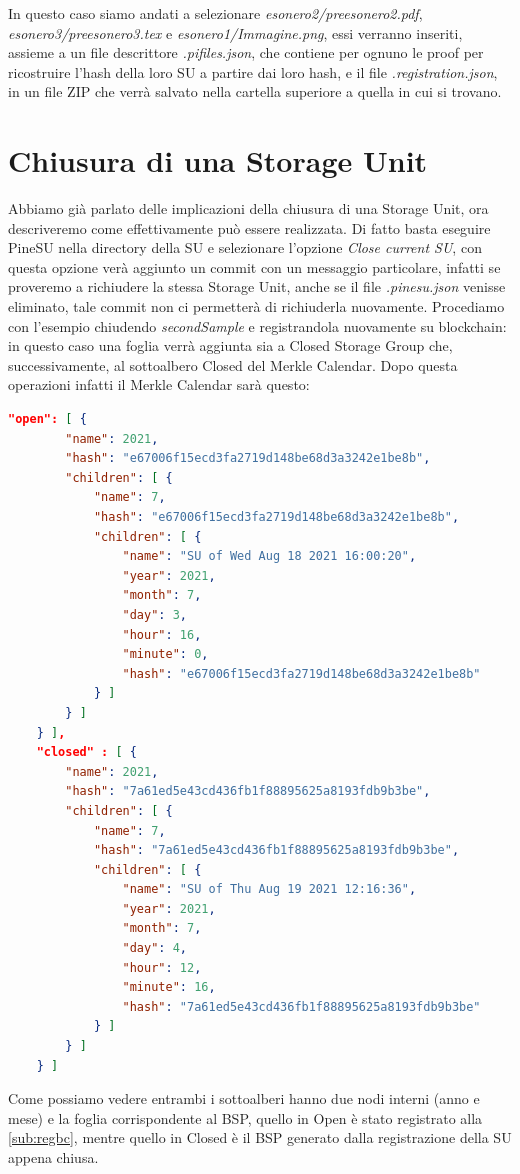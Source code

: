 In questo caso siamo andati a selezionare \emph{esonero2/preesonero2.pdf},
\emph{esonero3/preesonero3.tex} e \emph{esonero1/Immagine.png}, essi verranno inseriti,
assieme a un file descrittore \emph{.pifiles.json}, che contiene per ognuno le proof
per ricostruire l'hash della loro SU a partire dai loro hash, e il file \emph{.registration.json},
in un file ZIP che verrà salvato nella cartella superiore a quella in cui si trovano.

\section{Chiusura di una Storage Unit}
Abbiamo già parlato delle implicazioni della chiusura di una Storage Unit, ora descriveremo come
effettivamente può essere realizzata. Di fatto basta eseguire PineSU nella directory della SU e
selezionare l'opzione \emph{Close current SU}, con questa opzione verà aggiunto un commit con un
messaggio particolare, infatti se proveremo a richiudere la stessa Storage Unit, anche se
il file \emph{.pinesu.json} venisse eliminato, tale commit non ci permetterà di richiuderla
nuovamente. Procediamo con l'esempio chiudendo \emph{secondSample} e registrandola nuovamente
su blockchain: in questo caso una foglia verrà aggiunta sia a Closed Storage Group che,
successivamente, al sottoalbero Closed del Merkle Calendar.
Dopo questa operazioni infatti il Merkle Calendar sarà questo:
\begin{lstlisting}[language=json,firstnumber=1,basicstyle=\small]
    "open": [ {
        "name": 2021,
        "hash": "e67006f15ecd3fa2719d148be68d3a3242e1be8b",
        "children": [ {
            "name": 7,
            "hash": "e67006f15ecd3fa2719d148be68d3a3242e1be8b",
            "children": [ {
                "name": "SU of Wed Aug 18 2021 16:00:20",
                "year": 2021,
                "month": 7,
                "day": 3,
                "hour": 16,
                "minute": 0,
                "hash": "e67006f15ecd3fa2719d148be68d3a3242e1be8b"
            } ]
        } ]
    } ],
    "closed" : [ {
        "name": 2021,
        "hash": "7a61ed5e43cd436fb1f88895625a8193fdb9b3be",
        "children": [ {
            "name": 7,
            "hash": "7a61ed5e43cd436fb1f88895625a8193fdb9b3be",
            "children": [ {
                "name": "SU of Thu Aug 19 2021 12:16:36",
                "year": 2021,
                "month": 7,
                "day": 4,
                "hour": 12,
                "minute": 16,
                "hash": "7a61ed5e43cd436fb1f88895625a8193fdb9b3be"
            } ]
        } ]
    } ]  
\end{lstlisting}
Come possiamo vedere entrambi i sottoalberi hanno due nodi interni (anno e mese) e la foglia
corrispondente al BSP, quello in Open è stato registrato alla \autoref{sub:regbc}, mentre quello
in Closed è il BSP generato dalla registrazione della SU appena chiusa.

